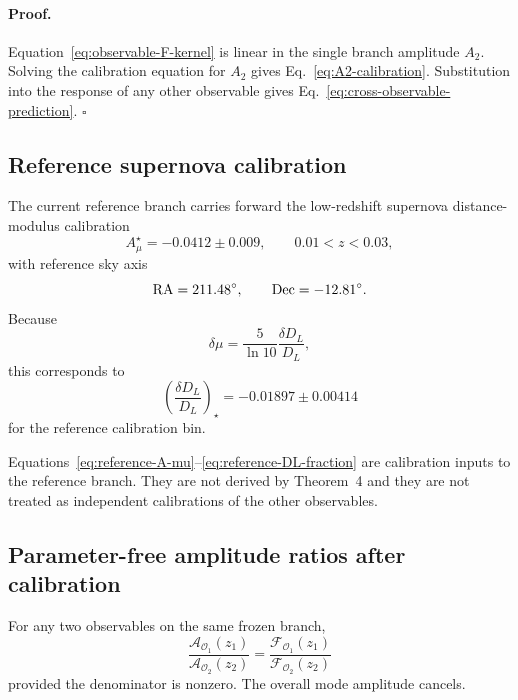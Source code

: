 \paragraph{Proof.}
Equation~\eqref{eq:observable-F-kernel} is linear in the single branch
amplitude $A_2$.  Solving the calibration equation for $A_2$ gives
Eq.~\eqref{eq:A2-calibration}.  Substitution into the response of any other
observable gives Eq.~\eqref{eq:cross-observable-prediction}. \hfill$\square$

\subsection{Reference supernova calibration}

The current reference branch carries forward the low-redshift supernova
distance-modulus calibration
\begin{equation}
A_\mu^\star
=
-0.0412\pm0.009,
\qquad
0.01<z<0.03,
\label{eq:reference-A-mu}
\end{equation}
with reference sky axis
\begin{equation}
{\rm RA}=211.48^\circ,
\qquad
{\rm Dec}=-12.81^\circ .
\label{eq:reference-axis}
\end{equation}
Because
\begin{equation}
\delta\mu
=
\frac{5}{\ln 10}
\frac{\delta D_L}{D_L},
\end{equation}
this corresponds to
\begin{equation}
\boxed{
\left(
\frac{\delta D_L}{D_L}
\right)_\star
=
-0.01897\pm0.00414
}
\label{eq:reference-DL-fraction}
\end{equation}
for the reference calibration bin.

Equations~\eqref{eq:reference-A-mu}--\eqref{eq:reference-DL-fraction} are
calibration inputs to the reference branch.  They are not derived by
Theorem~4 and they are not treated as independent calibrations of the other
observables.

\subsection{Parameter-free amplitude ratios after calibration}

For any two observables on the same frozen branch,
\begin{equation}
\boxed{
\frac{
\mathcal A_{\mathcal O_1}(z_1)
}{
\mathcal A_{\mathcal O_2}(z_2)
}
=
\frac{
\mathcal F_{\mathcal O_1}(z_1)
}{
\mathcal F_{\mathcal O_2}(z_2)
}
}
\label{eq:amplitude-ratio}
\end{equation}
provided the denominator is nonzero.  The overall mode amplitude cancels.


